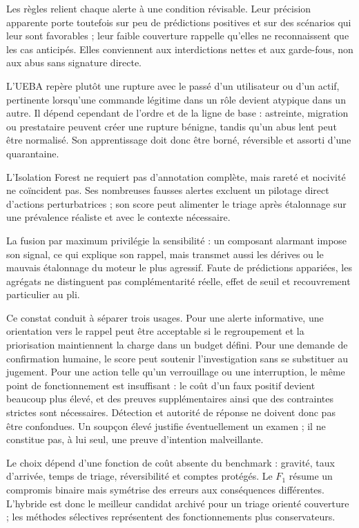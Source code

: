 \documentclass[11pt,a4paper,oneside]{report}
\theoremstyle{definition}
\theoremstyle{plain}
\begin{document}
Les règles relient chaque alerte à une condition révisable. Leur précision
apparente porte toutefois sur peu de prédictions positives et sur des scénarios
qui leur sont favorables ; leur faible couverture rappelle qu'elles ne
reconnaissent que les cas anticipés. Elles conviennent aux interdictions nettes
et aux garde-fous, non aux abus sans signature directe.

L'UEBA repère plutôt une rupture avec le passé d'un utilisateur ou d'un actif,
pertinente lorsqu'une commande légitime dans un rôle devient atypique dans un
autre. Il dépend cependant de l'ordre et de la ligne de base : astreinte,
migration ou prestataire peuvent créer une rupture bénigne, tandis qu'un abus
lent peut être normalisé. Son apprentissage doit donc être borné, réversible
et assorti d'une quarantaine.

L'Isolation Forest ne requiert pas d'annotation complète, mais rareté et
nocivité ne coïncident pas. Ses nombreuses fausses alertes excluent un pilotage
direct d'actions perturbatrices ; son score peut alimenter le triage après
étalonnage sur une prévalence réaliste et avec le contexte nécessaire.

La fusion par maximum privilégie la sensibilité : un composant alarmant impose
son signal, ce qui explique son rappel, mais transmet aussi les dérives ou le
mauvais étalonnage du moteur le plus agressif. Faute de prédictions appariées,
les agrégats ne distinguent pas complémentarité réelle, effet de seuil et
recouvrement particulier au pli.

Ce constat conduit à séparer trois usages. Pour une alerte informative, une
orientation vers le rappel peut être acceptable si le regroupement et la
priorisation maintiennent la charge dans un budget défini. Pour une demande de
confirmation humaine, le score peut soutenir l'investigation sans se
substituer au jugement. Pour une action telle qu'un verrouillage ou une
interruption, le même point de fonctionnement est insuffisant : le coût d'un
faux positif devient beaucoup plus élevé, et des preuves supplémentaires ainsi
que des contraintes strictes sont nécessaires. Détection et autorité de
réponse ne doivent donc pas être confondues. Un soupçon élevé justifie
éventuellement un examen ; il ne constitue pas, à lui seul, une preuve
d'intention malveillante.

Le choix dépend d'une fonction de coût absente du benchmark : gravité, taux
d'arrivée, temps de triage, réversibilité et comptes protégés. Le \(F_1\)
résume un compromis binaire mais symétrise des erreurs aux conséquences
différentes. L'hybride est donc le meilleur candidat archivé pour un triage
orienté couverture ; les méthodes sélectives représentent des fonctionnements
plus conservateurs.
\end{document}

